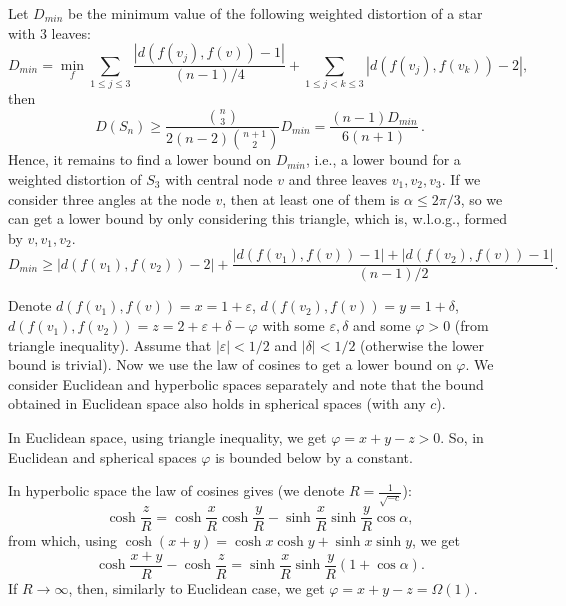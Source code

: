 \documentclass[runningheads]{llncs}
\begin{document}
Let $D_{min}$ be the minimum value of the following weighted distortion of a star with 3 leaves:
\[
D_{min} = \min_{f} \sum_{1\le j \le 3}  \frac{|d(f(v_j),f(v)) - 1|}{(n-1)/4} +
\sum_{1\le j < k\le 3}  |d(f(v_j),f(v_k)) - 2|,
\]
then 
\begin{equation}\label{eq:D_min}
D(S_n) \ge \frac{{n\choose 3}}{2(n-2){n+1 \choose 2}} D_{min} = \frac{ (n-1)D_{min}}{6(n+1)}\,.
\end{equation}
Hence, it remains to find a lower bound on $D_{min}$, i.e., a lower bound for a weighted distortion of $S_3$ with central node $v$ and three leaves $v_1, v_2, v_3$.
If we consider three angles at the node $v$, then at least one of them is $\alpha \le 2 \pi / 3$, so we can get a lower bound by only considering this triangle, which is, w.l.o.g., formed by $v, v_1, v_2$.
\[
D_{min} \ge  |d(f(v_1),f(v_2)) - 2| + \frac{|d(f(v_1),f(v)) - 1| + |d(f(v_2),f(v)) - 1|}{(n-1)/2}.
\]

Denote $d(f(v_1),f(v)) = x = 1 + \varepsilon$, $d(f(v_2),f(v)) = y = 1 + \delta$, $d(f(v_1),f(v_2)) = z = 2 + \varepsilon + \delta - \varphi$ with some $\varepsilon, \delta$ and some $\varphi > 0$ (from triangle inequality). Assume that $|\varepsilon| < 1/2$ and $|\delta| < 1/2$ (otherwise the lower bound is trivial). Now we use the law of cosines to get a lower bound on $\varphi$.
We consider Euclidean and hyperbolic spaces separately and note that the bound obtained in Euclidean space also holds in spherical spaces (with any $c$).

In Euclidean space, using triangle inequality, we get  $\varphi = x + y - z > 0$. So, in Euclidean and spherical spaces $\varphi$ is bounded below by a constant.

In hyperbolic space the law of cosines gives 
(we denote $R = \frac{1}{\sqrt{-c}}$):
\[
\cosh \frac{z}{R} = \cosh \frac{x}{R} \cosh \frac{y}{R} - \sinh \frac{x}{R} \sinh \frac{y}{R} \cos \alpha,
\]
from which, using $\cosh(x+y) =\cosh x\cosh y+\sinh x\sinh y$, we get 
\[
\cosh \frac{x+y}{R} - \cosh \frac{z}{R} = \sinh \frac{x}{R} \sinh \frac{y}{R} (1 + \cos \alpha). %
\]
If $R \to \infty$, then, similarly to Euclidean case, we get $\varphi = x + y - z = \Omega(1)$. 
\end{document}
